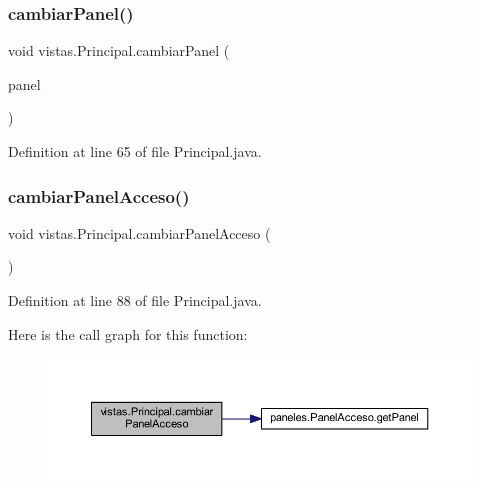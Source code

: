 \subsubsection{\texorpdfstring{cambiar\+Panel()}{cambiarPanel()}}
{\footnotesize\ttfamily void vistas.\+Principal.\+cambiar\+Panel (\begin{DoxyParamCaption}\item[{J\+Panel}]{panel }\end{DoxyParamCaption})}



Definition at line 65 of file Principal.\+java.

\mbox{\label{classvistas_1_1_principal_a0823d729a42c384bf4afd30b60a3e468}} 
\subsubsection{\texorpdfstring{cambiar\+Panel\+Acceso()}{cambiarPanelAcceso()}}
{\footnotesize\ttfamily void vistas.\+Principal.\+cambiar\+Panel\+Acceso (\begin{DoxyParamCaption}{ }\end{DoxyParamCaption})}



Definition at line 88 of file Principal.\+java.

Here is the call graph for this function\+:\nopagebreak
\begin{figure}[H]
\begin{center}
\leavevmode
\includegraphics[width=350pt]{classvistas_1_1_principal_a0823d729a42c384bf4afd30b60a3e468_cgraph}
\end{center}
\end{figure}
\mbox{\label{classvistas_1_1_principal_aa6783bab03cc60f1bf401d4c16293318}} 
